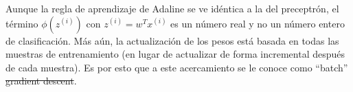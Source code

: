 Aunque la regla de aprendizaje de Adaline se ve idéntica a la del preceptrón,
el término $\phi(z^{(i)})$ con $z^{(i)}=w^Tx^{(i)}$ es un número real y no un
número entero de clasificación. Más aún, la actualización de los pesos está
basada en todas las muestras de entrenamiento (en lugar de actualizar de
forma incremental después de cada muestra). Es por esto que a este acercamiento
se le conoce como ``batch'' \sout{gradient descent}.

